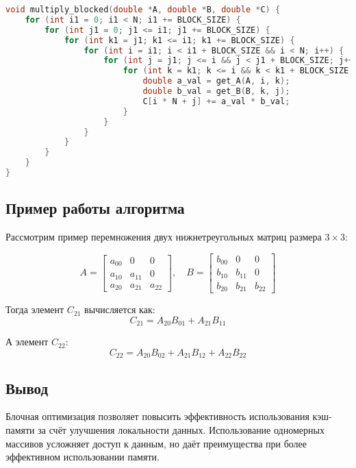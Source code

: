 \documentclass[14pt, russian]{matmex-diploma-custom}
\begin{document}
{\footnotesize
\begin{lstlisting}[language=C, caption={Алгоритм перемножения с блокировкой для 1D массивов}]
void multiply_blocked(double *A, double *B, double *C) {
    for (int i1 = 0; i1 < N; i1 += BLOCK_SIZE) {
        for (int j1 = 0; j1 <= i1; j1 += BLOCK_SIZE) {
            for (int k1 = j1; k1 <= i1; k1 += BLOCK_SIZE) {
                for (int i = i1; i < i1 + BLOCK_SIZE && i < N; i++) {
                    for (int j = j1; j <= i && j < j1 + BLOCK_SIZE; j++) {
                        for (int k = k1; k <= i && k < k1 + BLOCK_SIZE; k++) {
                            double a_val = get_A(A, i, k);
                            double b_val = get_B(B, k, j);
                            C[i * N + j] += a_val * b_val;
                        }
                    }
                }
            }
        }
    }
}

\end{lstlisting}
}

\subsection{Пример работы алгоритма}

Рассмотрим пример перемножения двух нижнетреугольных матриц размера $3 \times 3$:

\begin{equation*}
A = \begin{bmatrix}
a_{00} & 0       & 0 \\
a_{10} & a_{11} & 0 \\
a_{20} & a_{21} & a_{22}
\end{bmatrix}, \quad
B = \begin{bmatrix}
b_{00} & 0       & 0 \\
b_{10} & b_{11} & 0 \\
b_{20} & b_{21} & b_{22}
\end{bmatrix}
\end{equation*}

Тогда элемент $C_{21}$ вычисляется как:
\begin{equation*}
C_{21} = A_{20} B_{01} + A_{21} B_{11}
\end{equation*}

А элемент $C_{22}$:
\begin{equation*}
C_{22} = A_{20} B_{02} + A_{21} B_{12} + A_{22} B_{22}
\end{equation*}

\subsection{Вывод}
Блочная оптимизация позволяет повысить эффективность использования кэш-памяти за счёт улучшения локальности данных. Использование одномерных массивов усложняет доступ к данным, но даёт преимущества при более эффективном использовании памяти.
\end{document}
